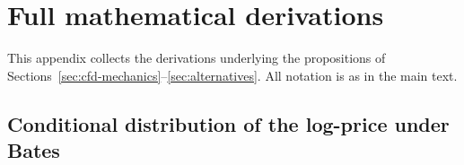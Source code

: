 \documentclass[preprint,12pt,authoryear]{elsarticle}
\theoremstyle{definition}
\begin{document}
\appendix

\section{Full mathematical derivations}
\label{app:derivations}

This appendix collects the derivations underlying the propositions
of Sections~\ref{sec:cfd-mechanics}--\ref{sec:alternatives}. All
notation is as in the main text.

\subsection{Conditional distribution of the log-price under Bates}
\label{app:bates-density}
\end{document}
